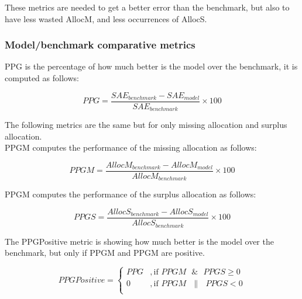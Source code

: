 These metrics are needed to get a better error than the benchmark, but also to have less wasted \gls{AllocM}, and less occurrences of \gls{AllocS}.\par

\subsubsection{Model/benchmark comparative metrics}

\gls{PPG} is the percentage of how much better is the model over the benchmark, it is computed as follows: 
\begin{linenomath}
    \begin{equation}\label{eq:PPG}
        PPG = \frac{SAE_{benchmark} - SAE_{model}}{SAE_{benchmark}} \times 100
    \end{equation}
    \end{linenomath}
		
The following metrics are the same but for only missing allocation and surplus allocation.\\
\gls{PPGM} computes the performance of the missing allocation as follows:\\

\begin{linenomath}
    \begin{equation}\label{eq:PPGM}
        PPGM = \frac{AllocM_{benchmark} - AllocM_{model}}{AllocM_{benchmark}} \times 100
    \end{equation}
    \end{linenomath}
		
\gls{PPGM} computes the performance of the surplus allocation as follows:

\begin{linenomath}
    \begin{equation}\label{eq:PPGS}
        PPGS = \frac{AllocS_{benchmark} - AllocS_{model}}{AllocS_{benchmark}} \times 100
    \end{equation}
    \end{linenomath}

The \gls{PPG}Positive metric is showing how much better is the model over the benchmark, but only if \gls{PPGM} and \gls{PPGM} are positive.\\

\begin{linenomath}
    \begin{equation}\label{eq:PPGPositive}
        PPG Positive = 
        \begin{cases} 
            PPG & , \text{if } PPGM \text{ }\&\text{ } PPGS \geq 0 \\
            0 & , \text{if } PPGM \text{ }\|\text{ } PPGS < 0 \\
        \end{cases} 
        \end{equation}
    \end{linenomath}
